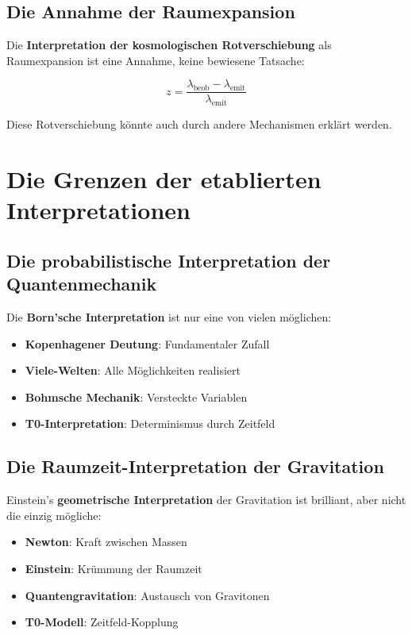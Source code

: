 \documentclass[12pt,a4paper]{report}
\begin{document}
	\subsection{Die Annahme der Raumexpansion}
	
	Die \textbf{Interpretation der kosmologischen Rotverschiebung} als Raumexpansion ist eine Annahme, keine bewiesene Tatsache:
	
	\begin{equation}
		z = \frac{\lambda_{\text{beob}} - \lambda_{\text{emit}}}{\lambda_{\text{emit}}}
	\end{equation}
	
	Diese Rotverschiebung könnte auch durch andere Mechanismen erklärt werden.
	
	\section{Die Grenzen der etablierten Interpretationen}
	
	\subsection{Die probabilistische Interpretation der Quantenmechanik}
	
	Die \textbf{Born'sche Interpretation} ist nur eine von vielen möglichen:
	
	\begin{itemize}
		\item \textbf{Kopenhagener Deutung}: Fundamentaler Zufall
		\item \textbf{Viele-Welten}: Alle Möglichkeiten realisiert
		\item \textbf{Bohmsche Mechanik}: Versteckte Variablen
		\item \textbf{T0-Interpretation}: Determinismus durch Zeitfeld
	\end{itemize}
	
	\subsection{Die Raumzeit-Interpretation der Gravitation}
	
	Einstein's \textbf{geometrische Interpretation} der Gravitation ist brilliant, aber nicht die einzig mögliche:
	
	\begin{itemize}
		\item \textbf{Newton}: Kraft zwischen Massen
		\item \textbf{Einstein}: Krümmung der Raumzeit
		\item \textbf{Quantengravitation}: Austausch von Gravitonen
		\item \textbf{T0-Modell}: Zeitfeld-Kopplung
	\end{itemize}
	
\end{document}
